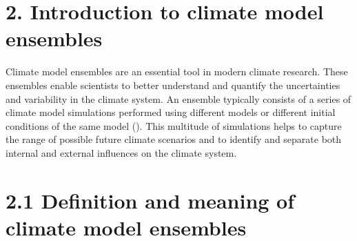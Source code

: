 \documentclass[
]{krantz}
\begin{document}
\section{2. Introduction to climate model ensembles}\label{introduction-to-climate-model-ensembles}

Climate model ensembles are an essential tool in modern climate research. These ensembles enable scientists to better understand and quantify the uncertainties and variability in the climate system. An ensemble typically consists of a series of climate model simulations performed using different models or different initial conditions of the same model (\citet{maher2021large}). This multitude of simulations helps to capture the range of possible future climate scenarios and to identify and separate both internal and external influences on the climate system.

\section{2.1 Definition and meaning of climate model ensembles}\label{definition-and-meaning-of-climate-model-ensembles}
\end{document}
